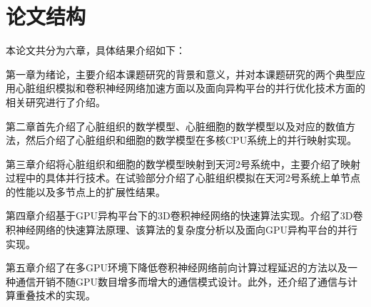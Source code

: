 \section{论文结构}
本论文共分为六章，具体结果介绍如下：

第一章为绪论，主要介绍本课题研究的背景和意义，并对本课题研究的两个典型应用\pozhehao 心脏组织模拟和卷积神经网络加速方面以及面向异构平台的并行优化技术方面的相关研究进行了介绍。

第二章首先介绍了心脏组织的数学模型、心脏细胞的数学模型以及对应的数值方法，然后介绍了心脏组织和细胞的数学模型在多核CPU系统上的并行映射实现。

第三章介绍将心脏组织和细胞的数学模型映射到天河2号系统中，主要介绍了映射过程中的具体并行技术。在试验部分介绍了心脏组织模拟在天河2号系统上单节点的性能以及多节点上的扩展性结果。

第四章介绍基于GPU异构平台下的3D卷积神经网络的快速算法实现。介绍了3D卷积神经网络的快速算法原理、该算法的复杂度分析以及面向GPU异构平台的并行实现。

第五章介绍了在多GPU环境下降低卷积神经网络前向计算过程延迟的方法以及一种通信开销不随GPU数目增多而增大的通信模式设计。此外，还介绍了通信与计算重叠技术的实现。






